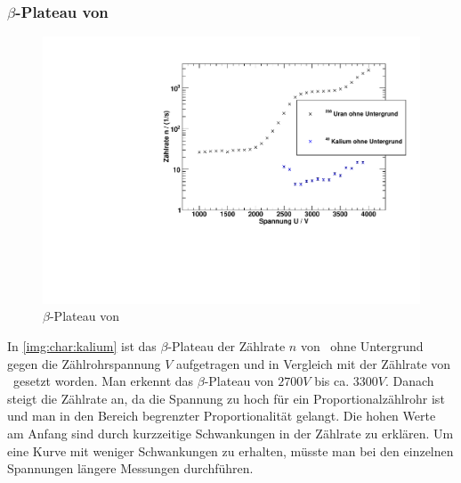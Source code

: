 \subsubsection{$\beta$-Plateau von \kalium}
\begin{figure}[H]
\begin{center}
  \includegraphics[width=15cm]{../img/Kalium40_Charakteristik.pdf}
  \caption[$\beta$-Plateau mit \kalium]{$\beta$-Plateau von \kalium}
  \label{img:char:kalium}
\end{center}
\end{figure}
In \autoref{img:char:kalium} ist das $\beta$-Plateau der Zählrate $n$ von \kalium\, ohne Untergrund gegen die Zählrohrspannung $V$ aufgetragen 
und in Vergleich mit der Zählrate von \uran\, gesetzt worden. Man erkennt das $\beta$-Plateau von $2700V$ bis ca. $3300V$. Danach steigt die 
Zählrate an, da die Spannung zu hoch für ein Proportionalzählrohr ist und man in den Bereich begrenzter Proportionalität gelangt. Die hohen Werte 
am Anfang sind durch kurzzeitige Schwankungen in der Zählrate zu erklären. Um eine Kurve mit weniger Schwankungen zu erhalten, müsste man bei den 
einzelnen Spannungen längere Messungen durchführen.

